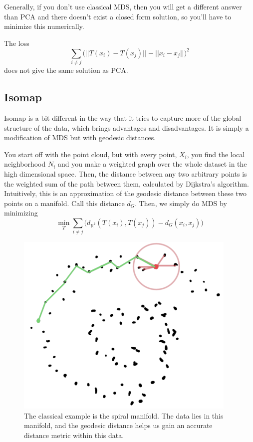     Generally, if you don't use classical MDS, then you will get a different answer than PCA and there doesn't exist a closed form solution, so you'll have to minimize this numerically. 

    \begin{example}
      The loss 
      \begin{equation}
        \sum_{i \neq j}  \big( ||T(x_i) - T(x_j)|| - ||x_i - x_j|| \big)^2 
      \end{equation}
      does not give the same solution as PCA. 
    \end{example}

  \subsection{Isomap} 

    Isomap is a bit different in the way that it tries to capture more of the global structure of the data, which brings advantages and disadvantages. It is simply a modification of MDS but with geodesic distances. 

    \begin{definition}[Isomap]
      You start off with the point cloud, but with every point, $X_i$, you find the local neighborhood $N_i$ and you make a weighted graph over the whole dataset in the high dimensional space. Then, the distance between any two arbitrary points is the weighted sum of the path between them, calculated by Dijkstra's algorithm. Intuitively, this is an approximation of the geodesic distance between these two points on a manifold. Call this distance $d_G$. Then, we simply do MDS by minimizing 
      \begin{equation}
        \min_{T} \sum_{i \neq j} \big( d_{\mathbb{R}^k}(T(x_i), T(x_j)) - d_G(x_i, x_j) \big)
      \end{equation}

      \begin{figure}[H]
        \centering 
        \includegraphics[scale=0.4]{img/isomap.png}
        \caption{The classical example is the spiral manifold. The data lies in this manifold, and the geodesic distance helps us gain an accurate distance metric within this data. } 
        \label{fig:isomap}
      \end{figure}
    \end{definition}

